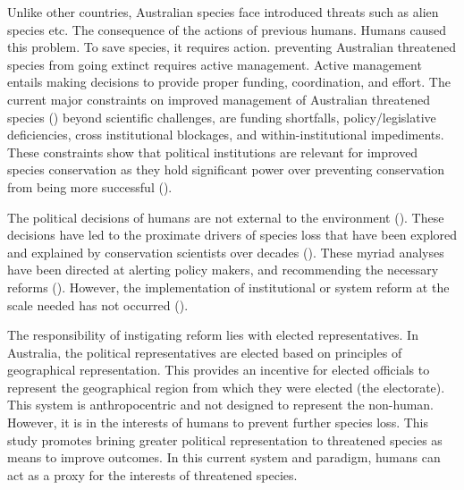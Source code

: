 \documentclass[a4paper,11pt]{article}
\begin{document}
Unlike other countries, Australian species face introduced threats such as alien species etc. The consequence of the actions of previous humans.
Humans caused this problem.
To save species, it requires action.
preventing Australian threatened species from going extinct requires active management. Active management entails making decisions to provide proper funding, coordination, and effort. The current major constraints on improved management of Australian threatened species (\cite{leggeMonitoringThreatenedSpecies2018, wintleSpendingWhatWill2019, simmondsVulnerableSpeciesEcosystems2020,kearneyThreatsAustraliaImperilled2019,woinarskiReadingBlackBook2019,wardLotsLossLittle2019}) beyond scientific challenges, are funding shortfalls, policy/legislative deficiencies, cross institutional blockages, and within-institutional impediments. These constraints show that political institutions are relevant for improved species conservation as they hold significant power over preventing conservation from being more successful (\cite{rydenLinkingDemocracyBiodiversity2020}).

The political decisions of humans are not external to the environment (\cite{rydenLinkingDemocracyBiodiversity2020, dalbyAnthropoceneFormationsEnvironmental2017a,burkeSpeciesBordersPolitical2020}). These decisions have led to the proximate drivers of species loss that have been explored and explained by conservation scientists over decades (\cite{kearneyThreatsAustraliaImperilled2019,allekThreatsEndangeringAustralia2018}). These myriad analyses have been directed at alerting policy makers, and recommending the necessary reforms (\cite{hawkeReportIndependentReview2009,samuelIndependentReviewEPBC2020,mcdonaldImprovingPolicyEfficiency2015}). However, the implementation of institutional or system reform at the scale needed has not occurred (\cite{woinarskiContributionPolicyLaw2017,resideHowSendFinch2019}).

The responsibility of instigating reform lies with elected representatives. In Australia, the political representatives are elected based on principles of geographical representation. This provides an incentive for elected officials to represent the geographical region from which they were elected (the electorate). This system is anthropocentric and not designed to represent the non-human. However, it is in the interests of humans to prevent further species loss. This study promotes brining greater political representation to threatened species as means to improve outcomes. In this current system and paradigm, humans can act as a proxy for the interests of threatened species.
\end{document}

